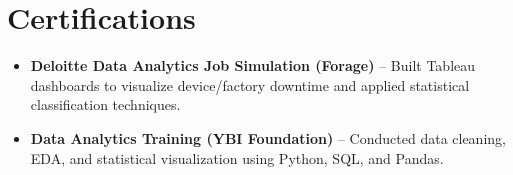 \documentclass[a4paper,10pt]{article}
\begin{document}
\section{Certifications}
\begin{itemize}
    \item \textbf{Deloitte Data Analytics Job Simulation (Forage)} -- Built Tableau dashboards to visualize device/factory downtime and applied statistical classification techniques.
    \item \textbf{Data Analytics Training (YBI Foundation)} -- Conducted data cleaning, EDA, and statistical visualization using Python, SQL, and Pandas.
\end{itemize}
\end{document}
